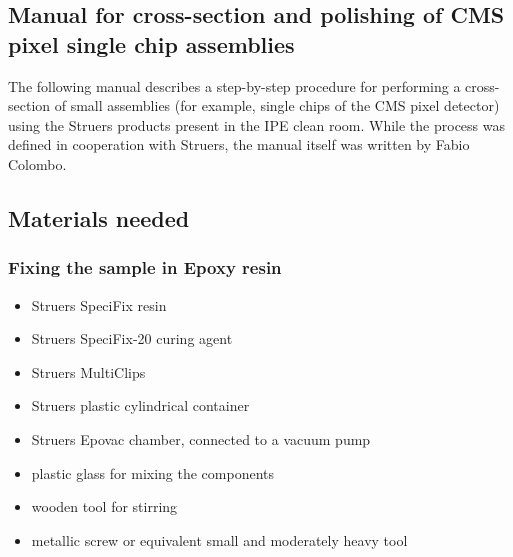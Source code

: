 \begin{appendices}
		








\chapter[Manual for cross-section and polishing]{Manual for cross-section and polishing of \acs{CMS} pixel single chip assemblies}
The following manual describes a step-by-step procedure for performing a cross-section of small assemblies (for example, single chips of the \ac{CMS} pixel detector) using the Struers products present in the IPE clean room. While the process was defined in cooperation with Struers, the manual itself was written by Fabio Colombo.
\section*{Materials needed}
\subsection*{Fixing the sample in Epoxy resin}
\begin{itemize}
\item Struers SpeciFix resin
\item Struers SpeciFix-20 curing agent
\item Struers MultiClips
\item Struers plastic cylindrical container
\item Struers Epovac chamber, connected to a vacuum pump
\item plastic glass for mixing the components
\item wooden tool for stirring 
\item metallic screw or equivalent small and moderately heavy tool
\end{itemize}

\end{appendices}
